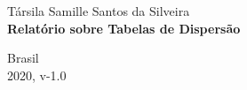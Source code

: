 \documentclass[a4paper, 12pt]{article}
\begin{document}
	
	\begin{titlepage}
		\begin{center}
			
			
			\large{Társila Samille Santos da Silveira}\\ 
			\vspace{155pt}
			\vspace{95pt}
			\textbf{\LARGE{Relatório sobre Tabelas de Dispersão }}\\
			\vspace{3,5cm}
		\end{center}
		
		
		
		
		\begin{center}
			\vspace{\fill}
			Brasil\\
			2020, v-1.0
		\end{center}
	\end{titlepage}
	
	
\end{document}
